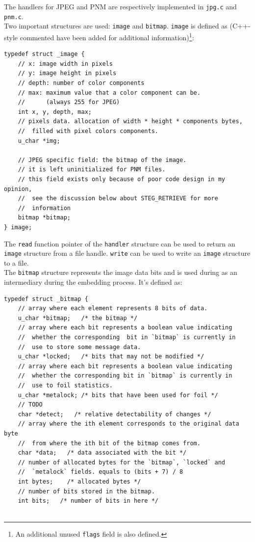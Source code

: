 \documentclass{article}
\begin{document}
\begin{itemize}

		The handlers for JPEG and PNM are respectively implemented in \texttt{jpg.c} and \texttt{pnm.c}. \\

		Two important structures are used: \texttt{image} and \texttt{bitmap}. \texttt{image} is defined as (C++-style commented have been added for additional information)\footnote{An additional unused \texttt{flags} field is also defined.}:
		\begin{verbatim}
typedef struct _image {
	// x: image width in pixels
	// y: image height in pixels
	// depth: number of color components
	// max: maximum value that a color component can be.
	//      (always 255 for JPEG)
	int x, y, depth, max;
	// pixels data. allocation of width * height * components bytes,
	//  filled with pixel colors components.
	u_char *img;

	// JPEG specific field: the bitmap of the image.
	// it is left uninitialized for PNM files.
	// this field exists only because of poor code design in my opinion,
	//  see the discussion below about STEG_RETRIEVE for more
	//  information
	bitmap *bitmap;
} image;
		\end{verbatim}

		The \texttt{read} function pointer of the \texttt{handler} structure can be used to return an \texttt{image} structure from a file handle. \texttt{write} can be used to write an \texttt{image} structure to a file. \\

		The \texttt{bitmap} structure represents the image data bits and is used during as an intermediary during the embedding process. It's defined as:
		\begin{verbatim}
typedef struct _bitmap {
	// array where each element represents 8 bits of data.
	u_char *bitmap;   /* the bitmap */
	// array where each bit represents a boolean value indicating
	//  whether the corresponding  bit in `bitmap` is currently in
	//  use to store some message data.
	u_char *locked;   /* bits that may not be modified */
	// array where each bit represents a boolean value indicating
	//  whether the corresponding bit in `bitmap` is currently in
	//  use to foil statistics.
	u_char *metalock; /* bits that have been used for foil */
	// TODO
	char *detect;   /* relative detectability of changes */
	// array where the ith element corresponds to the original data byte
	//  from where the ith bit of the bitmap comes from.
	char *data;   /* data associated with the bit */
	// number of allocated bytes for the `bitmap`, `locked` and
	//  `metalock` fields. equals to (bits + 7) / 8
	int bytes;    /* allocated bytes */
	// number of bits stored in the bitmap.
	int bits;   /* number of bits in here */
	

\end{verbatim}
\end{itemize}
\end{document}
